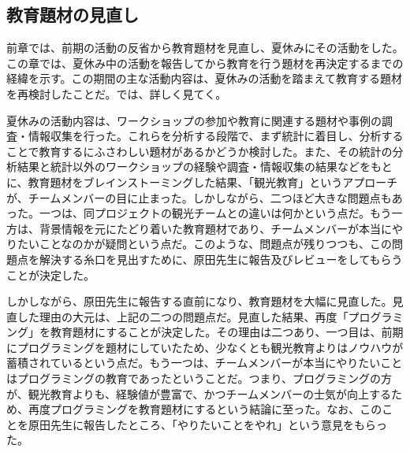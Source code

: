 \documentclass[openany,11pt,papersize]{jsbook}
\begin{document}
\subsection{教育題材の見直し}
\par 前章では、前期の活動の反省から教育題材を見直し、夏休みにその活動をした。この章では、夏休み中の活動を報告してから教育を行う題材を再決定するまでの経緯を示す。この期間の主な活動内容は、夏休みの活動を踏まえて教育する題材を再検討したことだ。では、詳しく見てく。
\par 夏休みの活動内容は、ワークショップの参加や教育に関連する題材や事例の調査・情報収集を行った。これらを分析する段階で、まず統計に着目し、分析することで教育するにふさわしい題材があるかどうか検討した。また、その統計の分析結果と統計以外のワークショップの経験や調査・情報収集の結果などをもとに、教育題材をブレインストーミングした結果、「観光教育」というアプローチが、チームメンバーの目に止まった。しかしながら、二つほど大きな問題点もあった。一つは、同プロジェクトの観光チームとの違いは何かという点だ。もう一方は、背景情報を元にたどり着いた教育題材であり、チームメンバーが本当にやりたいことなのかが疑問という点だ。このような、問題点が残りつつも、この問題点を解決する糸口を見出すために、原田先生に報告及びレビューをしてもらうことが決定した。
\par しかしながら、原田先生に報告する直前になり、教育題材を大幅に見直した。見直した理由の大元は、上記の二つの問題点だ。見直した結果、再度「プログラミング」を教育題材にすることが決定した。その理由は二つあり、一つ目は、前期にプログラミングを題材にしていたため、少なくとも観光教育よりはノウハウが蓄積されているという点だ。もう一つは、チームメンバーが本当にやりたいことはプログラミングの教育であったということだ。つまり、プログラミングの方が、観光教育よりも、経験値が豊富で、かつチームメンバーの士気が向上するため、再度プログラミングを教育題材にするという結論に至った。なお、このことを原田先生に報告したところ、「やりたいことをやれ」という意見をもらった。

\end{document}
